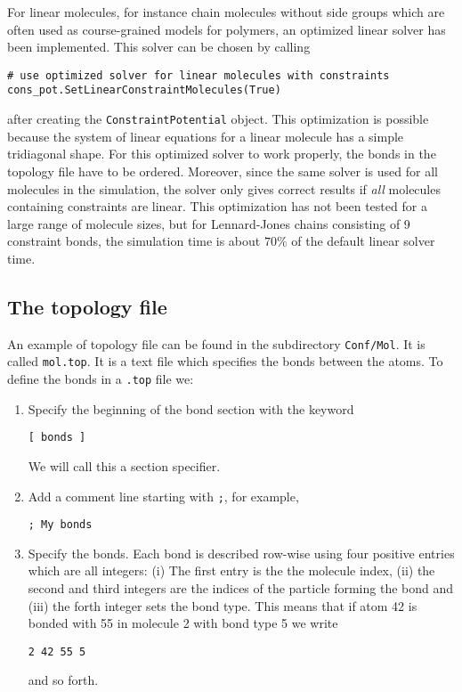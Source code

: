 \documentclass[a4paper]{article}
\begin{document}
For linear molecules, for instance chain molecules without side groups which are often used as course-grained models for polymers, an optimized linear solver has been implemented. This solver can be chosen by calling
\begin{verbatim}
# use optimized solver for linear molecules with constraints
cons_pot.SetLinearConstraintMolecules(True)
\end{verbatim}
after creating the \verb|ConstraintPotential| object. This optimization is possible because the system of linear equations for a linear molecule has a simple tridiagonal shape. For this optimized solver to work properly, the bonds in the topology file have to be ordered. Moreover, since the same solver is used for all molecules in the simulation, the solver only gives correct results if \emph{all} molecules containing constraints are linear. This optimization has not been tested for a large range of molecule sizes, but for Lennard-Jones chains consisting of 9 constraint bonds, the simulation time is about $70\%$ of the default linear solver time.

\subsection{The topology file}

An example of topology file can be found in the
subdirectory \verb|Conf/Mol|. It is called \verb|mol.top|. It is
a text file which specifies the bonds between the atoms.
To define the bonds in a \verb|.top| file we:
\begin{enumerate}
\item Specify the beginning of the bond section with the keyword
\begin{verbatim}
[ bonds ]
\end{verbatim}
We will call this a section specifier.
\item Add a comment line starting with \texttt{;}, for example,
\begin{verbatim}
; My bonds
\end{verbatim}
\item Specify the bonds.
  Each bond is described row-wise using four positive entries which
  are all integers:
  (i) The first entry is the the molecule index, (ii) the second
  and third integers are the indices of the particle forming
  the bond and (iii) the forth integer sets the bond type. This means
  that if atom 42 is bonded with 55 in molecule 2 with bond type 5 we
  write
\begin{verbatim}
2 42 55 5
\end{verbatim}
and so forth.
\end{enumerate}
\end{document}

